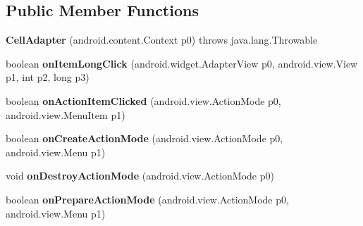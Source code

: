 \subsection*{Public Member Functions}
\begin{DoxyCompactItemize}
\item 
\hypertarget{classmd5282f1122c1313907b9bf274dd2c2f344_1_1CellAdapter_a20910cffbb5ef4307c15d490c69dcb97}{}{\bfseries Cell\+Adapter} (android.\+content.\+Context p0)  throws java.\+lang.\+Throwable 	\label{classmd5282f1122c1313907b9bf274dd2c2f344_1_1CellAdapter_a20910cffbb5ef4307c15d490c69dcb97}

\item 
\hypertarget{classmd5282f1122c1313907b9bf274dd2c2f344_1_1CellAdapter_a50666be942b55daf7ba92ff9b11313ec}{}boolean {\bfseries on\+Item\+Long\+Click} (android.\+widget.\+Adapter\+View p0, android.\+view.\+View p1, int p2, long p3)\label{classmd5282f1122c1313907b9bf274dd2c2f344_1_1CellAdapter_a50666be942b55daf7ba92ff9b11313ec}

\item 
\hypertarget{classmd5282f1122c1313907b9bf274dd2c2f344_1_1CellAdapter_ab5a221222bdef557bb308f835164351b}{}boolean {\bfseries on\+Action\+Item\+Clicked} (android.\+view.\+Action\+Mode p0, android.\+view.\+Menu\+Item p1)\label{classmd5282f1122c1313907b9bf274dd2c2f344_1_1CellAdapter_ab5a221222bdef557bb308f835164351b}

\item 
\hypertarget{classmd5282f1122c1313907b9bf274dd2c2f344_1_1CellAdapter_a4f9b6a270e02b7d113810bf423fe72aa}{}boolean {\bfseries on\+Create\+Action\+Mode} (android.\+view.\+Action\+Mode p0, android.\+view.\+Menu p1)\label{classmd5282f1122c1313907b9bf274dd2c2f344_1_1CellAdapter_a4f9b6a270e02b7d113810bf423fe72aa}

\item 
\hypertarget{classmd5282f1122c1313907b9bf274dd2c2f344_1_1CellAdapter_a5a5b94d8dc9ddda7b760d7cf3a82e441}{}void {\bfseries on\+Destroy\+Action\+Mode} (android.\+view.\+Action\+Mode p0)\label{classmd5282f1122c1313907b9bf274dd2c2f344_1_1CellAdapter_a5a5b94d8dc9ddda7b760d7cf3a82e441}

\item 
\hypertarget{classmd5282f1122c1313907b9bf274dd2c2f344_1_1CellAdapter_a64686aa260b11e7e6af56646a417788a}{}boolean {\bfseries on\+Prepare\+Action\+Mode} (android.\+view.\+Action\+Mode p0, android.\+view.\+Menu p1)\label{classmd5282f1122c1313907b9bf274dd2c2f344_1_1CellAdapter_a64686aa260b11e7e6af56646a417788a}


\end{DoxyCompactItemize}
